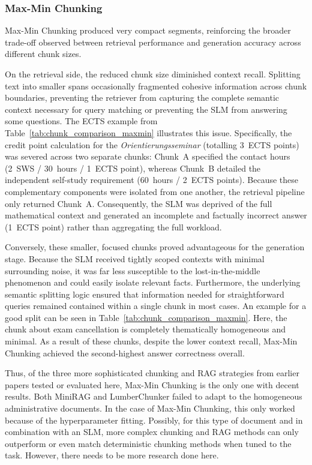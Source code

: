 \documentclass[12pt]{article} %
\begin{document}
\subsubsection{Max-Min Chunking}
Max-Min Chunking produced very compact segments, reinforcing the broader trade-off observed between retrieval performance and generation accuracy across different chunk sizes.

On the retrieval side, the reduced chunk size diminished context recall. Splitting text into smaller spans occasionally fragmented cohesive information across chunk boundaries, preventing the retriever from capturing the complete semantic context necessary for query matching or preventing the SLM from answering some questions. The ECTS example from Table~\ref{tab:chunk_comparison_maxmin} illustrates this issue. Specifically, the credit point calculation for the \textit{Orientierungsseminar} (totalling 3~ECTS points) was severed across two separate chunks: Chunk~A specified the contact hours (2~SWS / 30~hours / 1~ECTS point), whereas Chunk~B detailed the independent self-study requirement (60~hours / 2~ECTS points). Because these complementary components were isolated from one another, the retrieval pipeline only returned Chunk~A. Consequently, the SLM was deprived of the full mathematical context and generated an incomplete and factually incorrect answer (1~ECTS point) rather than aggregating the full workload.

Conversely, these smaller, focused chunks proved advantageous for the generation stage. Because the SLM received tightly scoped contexts with minimal surrounding noise, it was far less susceptible to the lost-in-the-middle phenomenon and could easily isolate relevant facts. Furthermore, the underlying semantic splitting logic ensured that information needed for straightforward queries remained contained within a single chunk in most cases. An example for a good split can be seen in Table~\ref{tab:chunk_comparison_maxmin}. Here, the chunk about exam cancellation is completely thematically homogeneous and minimal. As a result of these chunks, despite the lower context recall, Max-Min Chunking achieved the second-highest answer correctness overall.

Thus, of the three more sophisticated chunking and RAG strategies from earlier papers tested or evaluated here, Max-Min Chunking is the only one with decent results. Both MiniRAG and LumberChunker failed to adapt to the homogeneous administrative documents. In the case of Max-Min Chunking, this only worked because of the hyperparameter fitting. Possibly, for this type of document and in combination with an SLM, more complex chunking and RAG methods can only outperform or even match deterministic chunking methods when tuned to the task. However, there needs to be more research done here.
\end{document}
